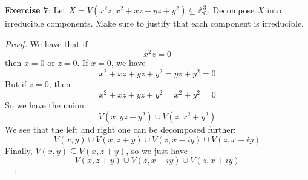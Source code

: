 \documentclass{article}
\begin{document}
\textbf{Exercise 7}: Let $X = V(x^{2}z, x^{2} + xz + yz + y^{2}) \subseteq \mathbb{A}_{\mathbb{C}}^{3}$. Decompose $X$ into irreducible components. Make sure to justify that each component is irreducible.
    \begin{proof}
        We have that if 
            \begin{equation*}
                x^{2}z = 0
            \end{equation*}
        then $x = 0$ or $z = 0$. If $x = 0$, we have 
            \begin{equation*}
                x^{2} + xz + yz + y^{2} = yz + y^{2} = 0
            \end{equation*}
        But if $z = 0$, then
            \begin{equation*}
                x^{2} + xz + yz + y^{2} = x^{2} + y^{2} = 0
            \end{equation*}
        So we have the union:
            \begin{equation*}
                V(x, yz + y^{2}) \cup V(z, x^{2} + y^{2})
            \end{equation*}
        We see that the left and right one can be decomposed further:
            \begin{equation*}
                V(x, y) \cup V(x, z + y) \cup V(z, x - iy) \cup V(z, x + iy)
            \end{equation*}
        Finally, $V(x, y) \subseteq V(x, z + y)$, so we just have
            \begin{equation*}
                V(x, z + y) \cup V(z, x - iy) \cup V(z, x + iy)
            \end{equation*}
    \end{proof}
\end{document}
